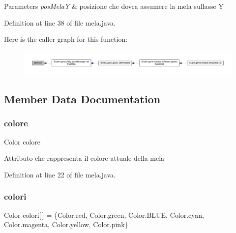 \begin{DoxyParams}{Parameters}
{\em pos\+MelaY} & posizione che dovra\textquotesingle{} assumere la mela sull\textquotesingle{}asse Y \\
\hline
\end{DoxyParams}


Definition at line 38 of file mela.\+java.

Here is the caller graph for this function\+:
\nopagebreak
\begin{figure}[H]
\begin{center}
\leavevmode
\includegraphics[width=350pt]{class_snake_1_1game_1_1vipera_1_1mela_abb7df6a3b7f27271ff796f1b39d5b800_icgraph}
\end{center}
\end{figure}


\subsection{Member Data Documentation}
\mbox{\label{class_snake_1_1game_1_1vipera_1_1mela_ada0bf0be39e4ad9d58f6e7c48f14c64a}} 
\subsubsection{\texorpdfstring{colore}{colore}}
{\footnotesize\ttfamily Color colore\hspace{0.3cm}{\ttfamily [private]}}

Attributo che rappresenta il colore attuale della mela 

Definition at line 22 of file mela.\+java.

\mbox{\label{class_snake_1_1game_1_1vipera_1_1mela_a2af643ee90f15c4b4028c2dedf6a9da5}} 
\subsubsection{\texorpdfstring{colori}{colori}}
{\footnotesize\ttfamily Color colori\mbox{[}$\,$\mbox{]} = \{Color.\+red, Color.\+green, Color.\+B\+L\+UE, Color.\+cyan, Color.\+magenta, Color.\+yellow, Color.\+pink\}\hspace{0.3cm}{\ttfamily [private]}}

